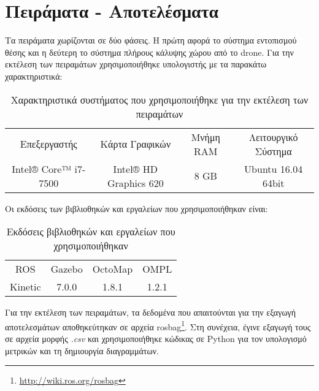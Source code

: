 \chapter{Πειράματα - Αποτελέσματα}
\label{chapter:experiments}

Τα πειράματα χωρίζονται σε δύο φάσεις. Η πρώτη αφορά το σύστημα εντοπισμού θέσης και η δεύτερη το σύστημα πλήρους κάλυψης χώρου από το drone. Για την εκτέλεση των πειραμάτων χρησιμοποιήθηκε υπολογιστής με τα παρακάτω χαρακτηριστικά:
\begin{table}[H]
    \begin{center}
        \small
        \caption{Χαρακτηριστικά συστήματος που χρησιμοποιήθηκε για την εκτέλεση των πειραμάτων}
        \label{tab:pc_specs}
        \begin{tabular}{| c | c | c | c |}
        \hline
        \rowcolor{Gray}
        Επεξεργαστής & Κάρτα Γραφικών & Μνήμη RAM & Λειτουργικό Σύστημα \\
        Intel® Core™ i7-7500 & Intel® HD Graphics 620 & 8 GB & Ubuntu 16.04 64bit\\
        \hline
        \end{tabular}
    \end{center}
\end{table}

Οι εκδόσεις των βιβλιοθηκών και εργαλείων που χρησιμοποιήθηκαν είναι:
\begin{table}[H]
    \begin{center}
        \caption{Εκδόσεις βιβλιοθηκών και εργαλείων που χρησιμοποιήθηκαν}
        \label{tab:tools_versions}
        \begin{tabular}{| c | c | c | c |}
        \hline
        \rowcolor{Gray}
        ROS & Gazebo & OctoMap & OMPL \\
        Kinetic & 7.0.0 & 1.8.1 & 1.2.1 \\
        \hline
        \end{tabular}
    \end{center}
\end{table}

Για την εκτέλεση των πειραμάτων, τα δεδομένα που απαιτούνται για την εξαγωγή αποτελεσμάτων αποθηκεύτηκαν σε αρχεία rosbag\footnote{\href{http://wiki.ros.org/rosbag}{http://wiki.ros.org/rosbag}}. Στη συνέχεια, έγινε εξαγωγή τους σε αρχεία μορφής \emph{.csv} και χρησιμοποιήθηκε κώδικας σε Python για τον υπολογισμό μετρικών και τη δημιουργία διαγραμμάτων.


\newpage
